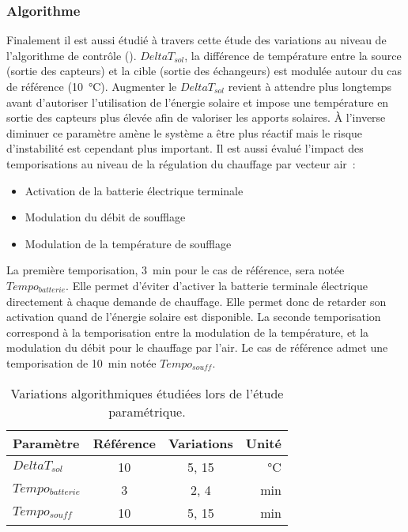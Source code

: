 \subsubsection{Algorithme} %
\label{ssub:variations_algorithmiques}
Finalement il est aussi étudié à travers cette étude des variations au niveau de
l’algorithme de contrôle (). $DeltaT_{sol}$, la différence de
température entre la source (sortie des capteurs) et la cible (sortie des échangeurs) est
modulée autour du cas de référence (\SI{10}{\celsius}). Augmenter le $DeltaT_{sol}$
revient à attendre plus longtemps avant d’autoriser l’utilisation de l’énergie solaire et
impose une température en sortie des capteurs plus élevée afin de valoriser les apports
solaires. À l’inverse diminuer ce paramètre amène le système a être plus réactif mais le
risque d’instabilité est cependant plus important. Il est aussi évalué l’impact des
temporisations au niveau de la régulation du chauffage par vecteur air~:
\begin{itemize}
  \item Activation de la batterie électrique terminale
  \item Modulation du débit de soufflage
  \item Modulation de la température de soufflage
\end{itemize}
La première temporisation, \SI{3}{min} pour le cas de référence, sera notée
$Tempo_{batterie}$. Elle permet d’éviter d’activer la batterie terminale électrique
directement à chaque demande de chauffage. Elle permet donc de retarder son activation
quand de l’énergie solaire est disponible. La seconde temporisation correspond à la temporisation
entre la modulation de la température, et la modulation du débit pour le chauffage par
l’air. Le cas de référence admet une temporisation de \SI{10}{min} notée $Tempo_{souff}$.

\begin{table}
\centering
\caption{Variations algorithmiques étudiées lors de l’étude paramétrique.
\label{tab:variations_algo}}
\begin{tabular}{l c c r}
    \toprule
    Paramètre          & Référence & Variations          & Unité         \\
    \midrule
    $DeltaT_{sol}$     & \num{10}  & \num{5}, \num{15}   & \si{\celsius} \\
    $Tempo_{batterie}$ & \num{3}   & \num{2}, \num{4}    & \si{min}      \\
    $Tempo_{souff}$    & \num{10}  & \num{5}, \num{15}   & \si{min}      \\
    \bottomrule
\end{tabular}
\end{table}

